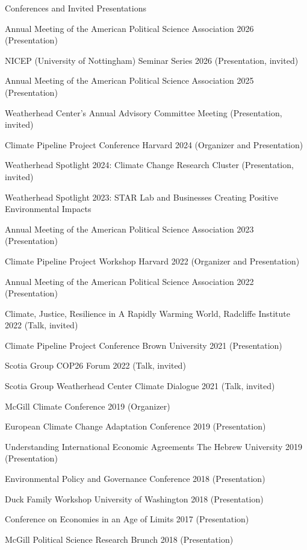 \documentclass{resume}
\begin{document}
\bigskip

\begin{rSection}{\Large C\MakeLowercase{onferences and} I\MakeLowercase{nvited} P\MakeLowercase{resentations}} \itemsep -2pt
\vspace{-0.7cm}
\item Annual Meeting of the American Political Science Association 2026 (Presentation)
\item NICEP (University of Nottingham) Seminar Series 2026 (Presentation, invited) 
\item Annual Meeting of the American Political Science Association 2025 (Presentation)
\item Weatherhead Center’s Annual Advisory Committee Meeting (Presentation, invited)
\item Climate Pipeline Project Conference Harvard 2024 (Organizer and Presentation)
\item Weatherhead Spotlight 2024: Climate Change Research Cluster (Presentation, invited)
\item Weatherhead Spotlight 2023: STAR Lab and Businesses Creating Positive Environmental Impacts
\item Annual Meeting of the American Political Science Association 2023 (Presentation)
\item Climate Pipeline Project Workshop Harvard 2022 (Organizer and Presentation)
\item Annual Meeting of the American Political Science Association 2022 (Presentation)
\item  Climate, Justice, Resilience in A Rapidly Warming World, Radcliffe Institute 2022 (Talk, invited) 
\item Climate Pipeline Project Conference Brown University 2021 (Presentation)
\item Scotia Group COP26 Forum 2022 (Talk, invited)
\item Scotia Group Weatherhead Center Climate Dialogue 2021 (Talk, invited)
\item McGill Climate Conference 2019 (Organizer) 
\item European Climate Change Adaptation Conference 2019 (Presentation)
\item Understanding International Economic Agreements The Hebrew University 2019 (Presentation)
\item Environmental Policy and Governance Conference 2018 (Presentation)
\item Duck Family Workshop University of Washington 2018 (Presentation)
\item Conference on Economies in an Age of Limits 2017 (Presentation) 
\item McGill Political Science Research Brunch 2018 (Presentation)
\end{rSection}
\end{document}
